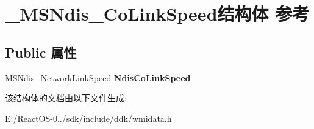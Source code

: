 \hypertarget{struct___m_s_ndis___co_link_speed}{}\section{\+\_\+\+M\+S\+Ndis\+\_\+\+Co\+Link\+Speed结构体 参考}
\label{struct___m_s_ndis___co_link_speed}
\subsection*{Public 属性}
\begin{DoxyCompactItemize}
\item 
\mbox{\label{struct___m_s_ndis___co_link_speed_a0c01ba4af13ff46fda03f75bb1a31f63}} 
\hyperlink{struct___m_s_ndis___network_link_speed}{M\+S\+Ndis\+\_\+\+Network\+Link\+Speed} {\bfseries Ndis\+Co\+Link\+Speed}
\end{DoxyCompactItemize}


该结构体的文档由以下文件生成\+:\begin{DoxyCompactItemize}
\item 
E\+:/\+React\+O\+S-\/0../sdk/include/ddk/wmidata.\+h\end{DoxyCompactItemize}
